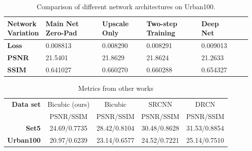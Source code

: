 \documentclass[11pt]{article}
\begin{document}
\begin{table}[h!]
    \renewcommand{\arraystretch}{1.5}
    \begin{tabularx}{\textwidth}{ |X*{6}{|R}| }
        \hline
        \parbox[t]{5cm}{\textbf{Network\\ Variation}} & \centering Main Net Zero-Pad & \centering Upscale Only & \centering Two-step Training & \centering Deep Net \tabularnewline
        \hline
        \textbf{Loss}& 0.008813 & 0.008290 & 0.008291 & 0.009013 \\
        \hline
        \textbf{PSNR}&  21.5401 &  21.8629 &  21.8624 &  21.2633 \\
        \hline
        \textbf{SSIM}& 0.641027 & 0.660270 & 0.660288 & 0.654327 \\
        \hline
    \end{tabularx}
    \caption{Comparison of different network architectures on Urban100.}
    \label{label:tableResultsSet100}
\end{table}

\begin{table}[h!]
    \centering
    \begin{tabular}{ |r|c|c|c|c| }
        \hline
        \textbf{Data set} & Bicubic (ours) & Bicubic \cite{kim2016deeply} & SRCNN \cite{dong2016image} & DRCN \cite{kim2016deeply} \\
        &PSNR/SSIM&PSNR/SSIM&PSNR/SSIM&PSNR/SSIM\\
        \hline
        \textbf{Set5}& 24.69/0.7735 & 28.42/0.8104 & 30.48/0.8628 & 31.53/0.8854 \\
        \hline
        \textbf{Urban100}& 20.97/0.6239 & 23.14/0.6577 & 24.52/0.7221 & 25.14/0.7510 \\
        \hline
    \end{tabular}
    \caption{Metrics from other works}
    \label{label:otherWorksMetrics}
\end{table}
\end{document}
